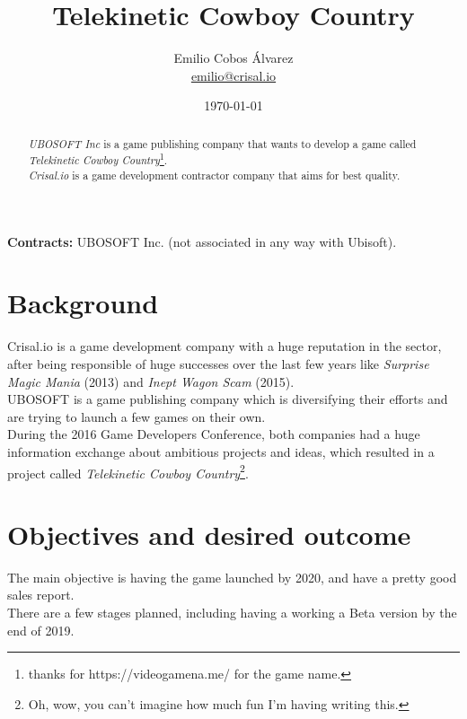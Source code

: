 \documentclass{article}
\title{Telekinetic Cowboy Country}
\author{
  Emilio Cobos Álvarez \\
  \small \href{mailto:emilio@crisal.io}{emilio@crisal.io}
}
\date{\today}
\begin{document}
\maketitle

\begin{center}
  {\bf Contracts:} UBOSOFT Inc. (not associated in any way with Ubisoft).
\end{center}

\begin{abstract}
  {\it UBOSOFT Inc} is a game publishing company that wants to develop a game
  called {\it Telekinetic Cowboy Country}\footnote{thanks for
  https://videogamena.me/ for the game name.}. \\

  {\it Crisal.io} is a game development contractor company that aims for best
  quality.
\end{abstract}

\clearpage
\tableofcontents

\clearpage

\section{Background}

  Crisal.io is a game development company with a huge reputation in the sector,
  after being responsible of huge successes over the last few years like {\it
  Surprise Magic Mania} (2013) and {\it Inept Wagon Scam} (2015). \\

  UBOSOFT is a game publishing company which is diversifying their efforts and
  are trying to launch a few games on their own. \\

  During the 2016 Game Developers Conference, both companies had a huge
  information exchange about ambitious projects and ideas, which resulted in a
  project called {\it Telekinetic Cowboy Country}\footnote{Oh, wow, you can't
  imagine how much fun I'm having writing this.}.

\section{Objectives and desired outcome}

  The main objective is having the game launched by 2020, and have a pretty good
  sales report. \\

  There are a few stages planned, including having a working a Beta version by
  the end of 2019. \\
\end{document}
